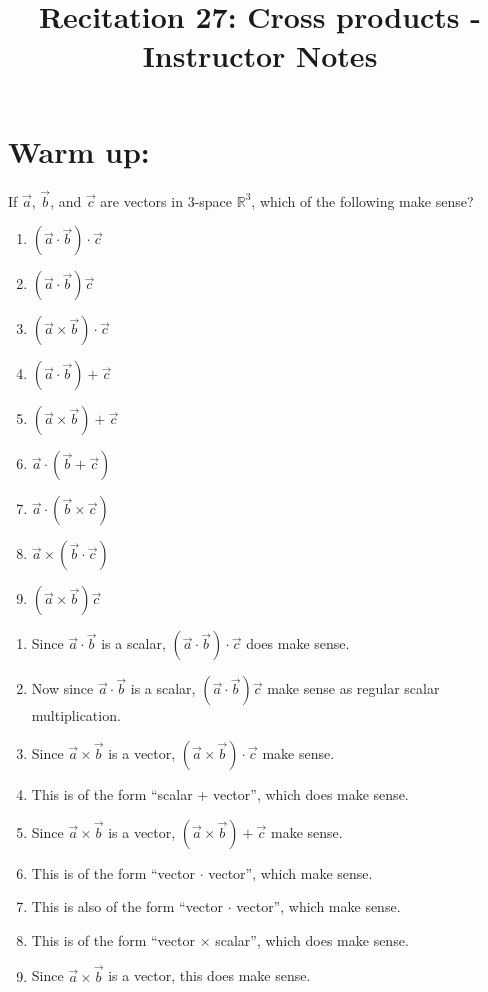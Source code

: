 \documentclass[handout,instructornotes]{ximera}
\title{Recitation 27: Cross products - Instructor Notes}
\begin{document}
\begin{abstract}		\end{abstract}
\maketitle



\section{Warm up:}
If $\vec{a}$, $\vec{b}$, and $\vec{c}$ are vectors in $3$-space $\mathbb{R}^3$, which of the following make sense?
	\begin{multicols}{3}
	\begin{enumerate}
	\item  $(\vec{a} \cdot \vec{b}) \cdot \vec{c}$
	\item  $(\vec{a} \cdot \vec{b})\vec{c}$
	\item  $(\vec{a} \times \vec{b}) \cdot \vec{c}$
	\item  $(\vec{a} \cdot \vec{b}) + \vec{c}$
	\item  $(\vec{a} \times \vec{b}) + \vec{c}$
	\item  $\vec{a} \cdot (\vec{b} + \vec{c})$
	\item  $\vec{a} \cdot (\vec{b} \times \vec{c})$
	\item  $\vec{a} \times (\vec{b} \cdot \vec{c})$
	\item  $(\vec{a} \times \vec{b}) \vec{c}$
	\end{enumerate}
	\end{multicols}
	
	\begin{freeResponse}
	\begin{enumerate}
	\item  Since $\vec{a} \cdot \vec{b}$ is a scalar, $(\vec{a} \cdot \vec{b}) \cdot \vec{c}$ does  make sense.
	\item  Now since $\vec{a} \cdot \vec{b}$ is a scalar, $(\vec{a} \cdot \vec{b})\vec{c}$  make sense as regular scalar multiplication.
	\item  Since $\vec{a} \times \vec{b}$ is a vector, $(\vec{a} \times \vec{b}) \cdot \vec{c}$  make sense.
	\item  This is of the form ``scalar + vector'', which does  make sense.
	\item  Since $\vec{a} \times \vec{b}$ is a vector, $(\vec{a} \times \vec{b}) + \vec{c}$  make sense.
	\item  This is of the form ``vector $\cdot$ vector'', which  make sense.
	\item  This is also of the form ``vector $\cdot$ vector'', which  make sense.
	\item  This is of the form ``vector $\times$ scalar'', which does  make sense.
	\item  Since $\vec{a} \times \vec{b}$ is a vector, this does  make sense.
	\end{enumerate}
	\end{freeResponse}
	
\end{document}
